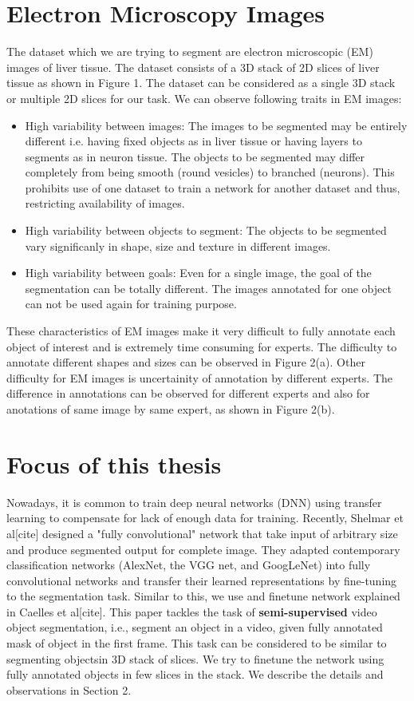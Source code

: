 \section{Electron Microscopy Images}
The dataset which we are trying to segment are electron microscopic (EM) images of liver tissue. The dataset consists of a 3D stack of 2D slices of liver tissue as shown in Figure 1. The dataset can be considered as a single 3D stack or multiple 2D slices for our task. We can observe following traits in EM images:
\begin{itemize}
\item High variability between images: The images to be segmented may be entirely different i.e. having fixed objects as in liver tissue or having layers to segments as in neuron tissue. The objects to be segmented may differ completely from being smooth (round vesicles) to branched (neurons). This prohibits use of one dataset to train a network for another dataset and thus, restricting availability of images.
\item High variability between objects to segment: The objects to be segmented vary significanly in shape, size and texture in different images.
\item High variability between goals: Even for a single image, the goal of the segmentation can be totally different. The images annotated for one object can not be used again for training purpose.
\end{itemize}
These characteristics of EM images make it very difficult to fully annotate each object of interest and is extremely time consuming for experts. The difficulty to annotate different shapes and sizes can be observed in Figure 2(a). Other difficulty for EM images is uncertainity of annotation by different experts. The difference in annotations can be observed for different experts and also for anotations of same image by same expert, as shown in Figure 2(b). \par

\section{Focus of this thesis}
Nowadays, it is common to train deep neural networks (DNN) using transfer learning to compensate for lack of enough data for training. Recently, Shelmar et al[cite] designed a "fully convolutional" network that take input of arbitrary size and produce segmented output for complete image. They adapted contemporary classification networks (AlexNet, the VGG net, and GoogLeNet) into fully convolutional networks and transfer their learned representations by fine-tuning to the segmentation task. Similar to this, we use and finetune network explained in Caelles et al[cite]. This paper tackles the task of \textbf{semi-supervised} video object segmentation, i.e., segment an object in a video, given fully annotated mask of object in the first frame. This task can be considered to be similar to segmenting objectsin 3D stack of slices. We try to finetune the network using fully annotated objects in few slices in the stack. We describe the details and observations in Section 2.


